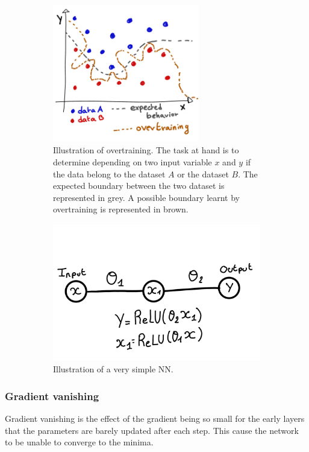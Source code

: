 \documentclass[../main.tex]{subfiles}
\begin{document}
\begin{figure}
  \centering
  \begin{subfigure}[t]{0.48\linewidth}
    \centering
    \includegraphics[height=6cm]{images/ml/overtraining.jpg}
    \caption{Illustration of overtraining. The task at hand is to determine depending on two input variable $x$ and $y$ if the data belong to the dataset $A$ or the dataset $B$. The expected boundary between the two dataset is represented in grey. A possible boundary learnt by overtraining is represented in brown.}
    \label{fig:ml:overtraining}
  \end{subfigure}
  \hfill
  \begin{subfigure}[t]{0.48\linewidth}
    \centering
    \includegraphics[height=6cm]{images/ml/vanishing_illus.jpg}
    \caption{Illustration of a very simple NN.}
    \label{fig:ml:vanishing}
  \end{subfigure}
  \caption{}
\end{figure}

\subsubsection{Gradient vanishing}
Gradient vanishing is the effect of the gradient being so small for the early layers that the parameters are barely updated after each step. This cause the network to be unable to converge to the minima.
\end{document}
